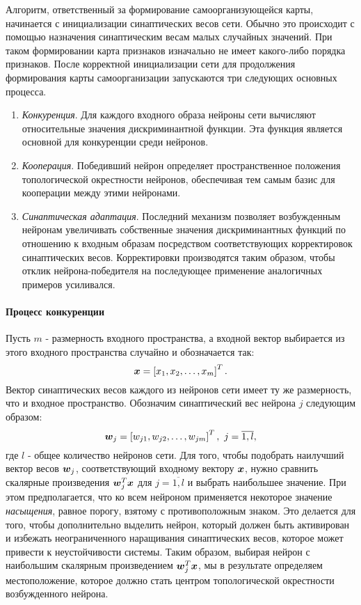 \documentclass[a4paper,12pt]{report}
\begin{document}
Алгоритм, ответственный за формирование самоорганизующейся карты,
начинается с инициализации синаптических весов сети. Обычно это
происходит с помощью назначения синаптическим весам малых случайных
значений. При таком формировании карта признаков изначально не имеет
какого-либо порядка признаков. После корректной инициализации сети для
продолжения формирования карты самоорганизации запускаются три
следующих основных процесса.
\begin{enumerate}
    \item \textit{Конкуренция}. Для каждого входного образа нейроны
        сети вычисляют относительные значения дискриминантной функции.
        Эта функция является основной для конкуренции среди нейронов.
    \item \textit{Кооперация}. Победивший нейрон определяет
        пространственное положения топологической окрестности
        нейронов, обеспечивая тем самым базис для кооперации между
        этими нейронами.
    \item \textit{Синаптическая адаптация}. Последний механизм
        позволяет возбужденным нейронам увеличивать собственные
        значения дискриминантных функций по отношению к входным
        образам посредством соответствующих корректировок
        синаптических весов. Корректировки производятся таким образом,
        чтобы отклик нейрона-победителя на последующее применение
        аналогичных примеров усиливался.
\end{enumerate}

\paragraph{Процесс конкуренции}
Пусть $m$ - размерность входного пространства, а входной вектор
выбирается из этого входного пространства случайно и обозначается так:
\begin{equation}
    \boldsymbol{x} =  \left[ x_1, x_2, \dots, x_m \right]^{T}.
\end{equation}
Вектор синаптических весов каждого из нейронов сети имеет ту же
размерность, что и входное пространство. Обозначим синаптический вес
нейрона $j$ следующим образом:
\begin{equation}
    \boldsymbol{w}_j = \left[ w_{j1}, w_{j2}, \dots, w_{jm} \right]^{T},\
    j=\overline{1,l},
\end{equation}
где $l$ - общее количество нейронов сети. Для того, чтобы подобрать
наилучший вектор весов $\boldsymbol{w}_j$, соответствующий входному вектору
$\boldsymbol{x}$, нужно сравнить скалярные произведения $\boldsymbol{w}_j^{T}\boldsymbol{x}$ для
$j=\overline{1,l}$ и выбрать наибольшее значение. При этом
предполагается, что ко всем нейроном применяется некоторое значение
\textit{насыщения}, равное порогу, взятому с противоположным знаком.
Это делается для того, чтобы дополнительно выделить нейрон, который
должен быть активирован и избежать неограниченного наращивания
синаптических весов, которое может привести к неустойчивости системы.
Таким образом, выбирая нейрон с наибольшим скалярным произведением
$\boldsymbol{w}_j^{T}\boldsymbol{x}$, мы в результате определяем местоположение, которое
должно стать центром топологической окрестности возбужденного нейрона.
\end{document}
